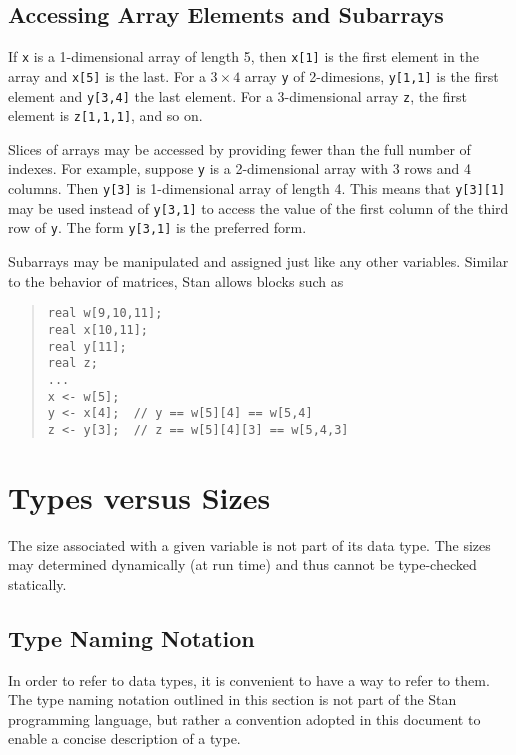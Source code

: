 \documentclass[10pt]{report}
\newcommand{\Stan}{Stan\xspace}
\newcommand{\code}[1]{{\tt #1}}
\begin{document}
\subsection{Accessing Array Elements and Subarrays}

If \code{x} is a 1-dimensional array of length 5, then \code{x[1]} is
the first element in the array and \code{x[5]} is the last.  For a $3
\times 4$ array \code{y} of 2-dimesions, \code{y[1,1]} is the first
element and \code{y[3,4]} the last element.  For a 3-dimensional
array \code{z}, the first element is \code{z[1,1,1]}, and so on.

Slices of arrays may be accessed by providing fewer than the full
number of indexes.  For example, suppose \code{y} is a 2-dimensional
array with 3 rows and 4 columns.  Then \code{y[3]} is 1-dimensional
array of length 4.  This means that \code{y[3][1]} may be used instead
of \code{y[3,1]} to access the value of the first column of the third
row of \code{y}.  The form \code{y[3,1]} is the preferred form.

Subarrays may be manipulated and assigned just like any other
variables.  Similar to the behavior of matrices, \Stan allows blocks
such as 
%
\begin{quote}
\begin{Verbatim} 
real w[9,10,11];
real x[10,11];
real y[11];
real z;
...
x <- w[5];
y <- x[4];  // y == w[5][4] == w[5,4]
z <- y[3];  // z == w[5][4][3] == w[5,4,3]
\end{Verbatim}
\end{quote}
%

\section{Types versus Sizes}

The size associated with a given variable is not part of its data
type.  The sizes may determined dynamically (at run time) and thus
cannot be type-checked statically.  

\subsection{Type Naming Notation}

In order to refer to data types, it is convenient to have a way to
refer to them.  The type naming notation outlined in this section is
not part of the \Stan programming language, but rather a convention
adopted in this document to enable a concise description of a type.
\end{document}
